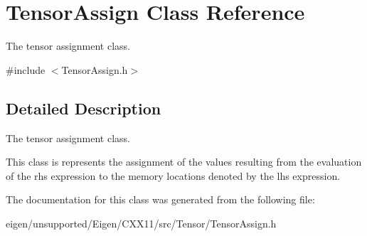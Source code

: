 \hypertarget{class_tensor_assign}{}\section{Tensor\+Assign Class Reference}
\label{class_tensor_assign}


The tensor assignment class.  




{\ttfamily \#include $<$Tensor\+Assign.\+h$>$}



\subsection{Detailed Description}
The tensor assignment class. 

This class is represents the assignment of the values resulting from the evaluation of the rhs expression to the memory locations denoted by the lhs expression. 

The documentation for this class was generated from the following file\+:\begin{DoxyCompactItemize}
\item 
eigen/unsupported/\+Eigen/\+C\+X\+X11/src/\+Tensor/\+Tensor\+Assign.\+h\end{DoxyCompactItemize}
